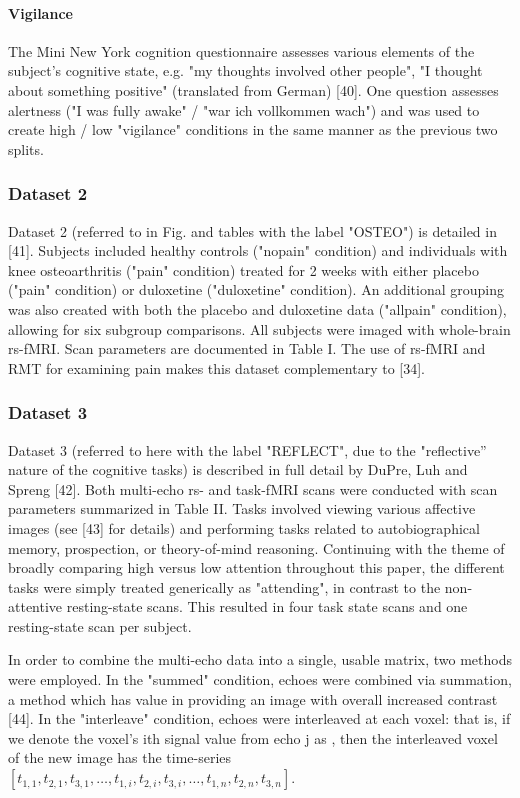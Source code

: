 \paragraph{Vigilance}
The Mini New York cognition questionnaire assesses various elements of the subject's cognitive
state, e.g. "my thoughts involved other people", "I thought about something positive" (translated
from German) [40]. One question assesses alertness ("I was fully awake" / "war ich vollkommen wach")
and was used to create high / low "vigilance" conditions in the same manner as the previous two splits.

\subsubsection{Dataset 2}
Dataset 2 (referred to in Fig. and tables with the label "OSTEO") is detailed in [41]. Subjects
included healthy controls ("nopain" condition) and individuals with knee osteoarthritis ("pain"
condition) treated for 2 weeks with either placebo ("pain" condition) or duloxetine ("duloxetine"
condition). An additional grouping was also created with both the placebo and duloxetine data
("allpain" condition), allowing for six subgroup comparisons. All subjects were imaged with
whole-brain rs-fMRI. Scan parameters are documented in Table I. The use of rs-fMRI and RMT for
examining pain makes this dataset complementary to [34].

\subsubsection{Dataset 3}
Dataset 3  (referred to here with the label "REFLECT", due to the "reflective” nature of the
cognitive tasks) is described in full detail by DuPre, Luh and Spreng [42]. Both multi-echo rs- and
task-fMRI scans were conducted with scan parameters summarized in Table II. Tasks involved viewing
various affective images (see [43] for details) and performing tasks related to autobiographical
memory, prospection, or theory-of-mind reasoning. Continuing with the theme of broadly comparing
high versus low attention throughout this paper, the different tasks were simply treated generically
as "attending", in contrast to the non-attentive resting-state scans. This resulted in four task
state scans and one resting-state scan per subject.

In order to combine the multi-echo data into a single, usable matrix, two methods were employed. In
the "summed" condition, echoes were combined via summation, a method which has value in providing an
image with overall increased contrast [44]. In the "interleave" condition, echoes were interleaved
at each voxel: that is, if we denote the voxel's ith signal value from echo j as , then the
interleaved voxel of the new image has the time-series
\([t_{1,1}, t_{2,1}, t_{3,1}, \dots, t_{1,i}, t_{2,i}, t_{3,i}, \dots, t_{1,n}, t_{2,n}, t_{3,n}]\).

